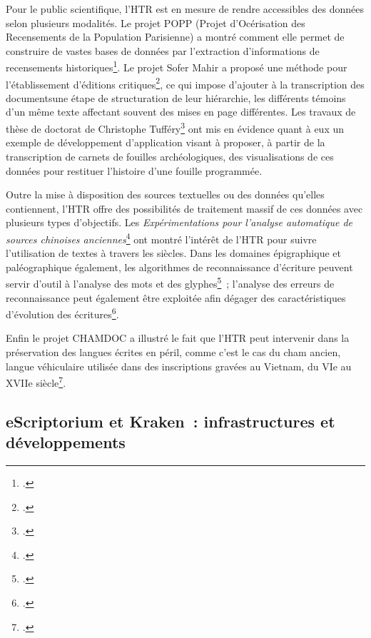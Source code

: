 \documentclass[a4paper,12pt,twoside]{book}
\begin{document}
		Pour le public scientifique, l'HTR est en mesure de rendre accessibles
		des données selon plusieurs modalités. Le projet POPP (Projet
		d'Océrisation des Recensements de la Population Parisienne) a montré
		comment elle permet de construire de vastes bases de données par
		l'extraction d'informations de recensements historiques\footcite{constumReconnaissanceExtractionInformations2022}. Le projet Sofer
		Mahir a proposé une méthode pour l'établissement d'éditions critiques\footcite{stoklbenezraHTRCriticalEdition2022}, ce qui impose d'ajouter à la
		transcription des documentsune étape de structuration de leur
		hiérarchie, les différents témoins d'un même texte affectant souvent des
		mises en page différentes. Les travaux de thèse de doctorat de
		Christophe Tufféry\footcite{tufferyRetourExperiencesUtilisation2022} ont
		mis en évidence quant à eux un exemple de développement d'application
		visant à proposer, à partir de la transcription de carnets de fouilles
		archéologiques, des visualisations de ces données pour restituer
		l'histoire d'une fouille programmée.
		
		Outre la mise à disposition des sources textuelles ou des données
		qu'elles contiennent, l'HTR offre des possibilités de traitement massif
		de ces données avec plusieurs types d'objectifs. Les
		\textit{Expérimentations pour l'analyse automatique de sources chinoises anciennes}\footcite{bizais-lilligExperimentationsPourAnalyse2022} ont
		montré l'intérêt de l'HTR pour suivre l'utilisation de textes à travers
		les siècles. Dans les domaines épigraphique et paléographique également,
		les algorithmes de reconnaissance d'écriture peuvent servir d'outil à
		l'analyse des mots et des glyphes\footcite{boschettiEpiSearchRecognisingAncient2022}~; l'analyse des erreurs de reconnaissance peut également être exploitée afin dégager des
		caractéristiques d'évolution des écritures\footcite{paraskeviHTRHandwrittenPaleographic2022}.
		
		Enfin le projet CHAMDOC a illustré le fait que l'HTR peut intervenir
		dans la préservation des langues écrites en péril, comme c'est le cas du
		cham ancien, langue véhiculaire utilisée dans des inscriptions gravées
		au Vietnam, du VIe au XVIIe siècle\footcite{schweyerAnalyseReconnaissanceIndexation2022}.
		
		\subsection{eScriptorium et Kraken~: infrastructures et développements}
		
\end{document}
